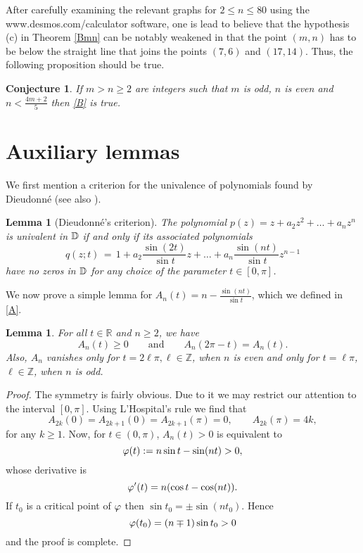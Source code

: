 \documentclass[11pt,reqno]{amsart}
\theoremstyle{plain}
\newtheorem{lemma}[theorem]{Lemma}
\newtheorem*{conjecture*}{Conjecture}
\theoremstyle{definition}
\theoremstyle{remark}
\newcommand {\SR}{{\mathbb R}}  \newcommand{\ST}{{\mathbb T}}  \newcommand{\SZ}{{\mathbb Z}}
\begin{document}
After carefully examining the relevant graphs for $2\leq n \leq 80$ using the www.desmos.com/calculator software, one is lead to believe that the hypothesis (c) in Theorem \ref{Bmn} can be notably weakened in that the point $(m,n)$ has to be below the straight line that joins the points $(7,6)$ and $(17,14)$. Thus, the following proposition should be true. 

\begin{conjecture*}
If $m>n\geq2$ are integers such that $m$ is odd, $n$ is even and $n< \frac{4m+2}{5}$ then \eqref{B} is true.
\end{conjecture*}

\section{Auxiliary lemmas}

We first mention a criterion for the univalence of polynomials found by Dieudonn\'e \cite{D31} (see also \cite[p.75]{Du2}).

\begin{lemma}[Dieudonn\'e's criterion] \label{Dieu}
The polynomial $p(z) = z+a_2z^2 + \ldots + a_nz^n$ is univalent in ${\mathbb D}$ if and only if its associated polynomials
$$
q(z;t) \, = \, 1 + a_2 \frac{\sin(2t)}{\sin t} z +\ldots + a_n \frac{\sin(nt)}{\sin t} z^{n-1}
$$
have no zeros in ${\mathbb D}$ for any choice of the parameter $t\in [0,\pi]$.
\end{lemma}

\vskip0.2cm
We now prove a simple lemma for $A_n(t) = n- \frac{\sin(nt)}{\sin t}$, which we defined in \eqref{A}.
\begin{lemma} \label{lemA}
For all $t\in\SR$ and $n\geq 2$, we have
$$
A_n(t) \geq 0 \qquad \text{and} \qquad A_n(2\pi-t) = A_n(t).
$$
Also, $A_n$ vanishes only for $t=2\ell\pi, \ell\in\SZ$, when $n$ is even and only for $t=\ell\pi$, $\ell\in\SZ$, when $n$ is odd. 
\end{lemma}
\begin{proof}
The symmetry is fairly obvious. Due to it we may restrict our attention to the interval $[0,\pi]$. Using L'Hospital's rule we find that 
$$
A_{2k}(0) = A_{2k+1}(0) = A_{2k+1}(\pi) = 0, \qquad  A_{2k}(\pi) = 4k,
$$
for any $k\geq1$. Now, for $t\in(0,\pi)$, $A_n(t) >0$ is equivalent to 
$$
\varphi(t) := n\sin t -\sin(nt) >0,  
$$
whose derivative is
$$
\varphi'(t) = n(\cos t - \cos(nt)).
$$
If $t_0$ is a critical point of $\varphi$ then $\sin t_0 = \pm \sin(nt_0)$. Hence 
$$
\varphi(t_0) = (n\mp1) \sin t_0 >0  
$$
and the proof is complete. 
\end{proof}
\end{document}
